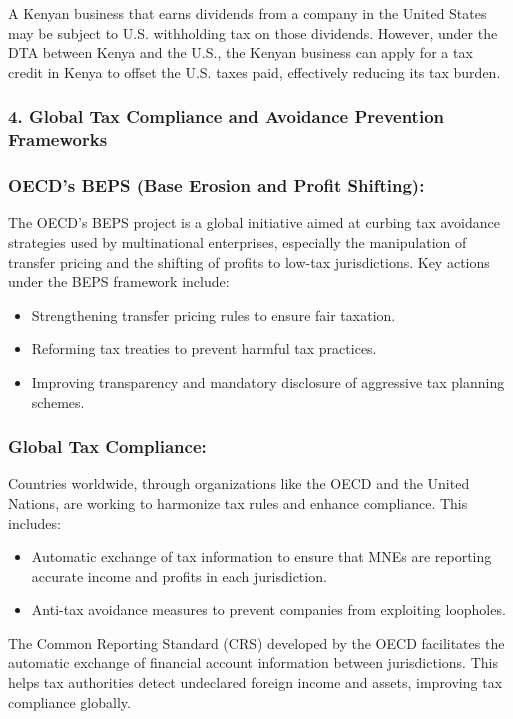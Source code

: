 \documentclass[10pt]{article}
\begin{document}
\begin{example}
	A Kenyan business that earns dividends from a company in the United States may be subject to U.S. withholding tax on those dividends. However, under the DTA between Kenya and the U.S., the Kenyan business can apply for a tax credit in Kenya to offset the U.S. taxes paid, effectively reducing its tax burden.
\end{example}


\subsubsection*{4. Global Tax Compliance and Avoidance Prevention Frameworks}
\subsubsection*{OECD's BEPS (Base Erosion and Profit Shifting):}
The OECD's BEPS project is a global initiative aimed at curbing tax avoidance strategies used by multinational enterprises, especially the manipulation of transfer pricing and the shifting of profits to low-tax jurisdictions. Key actions under the BEPS framework include:

\begin{itemize}
  \item Strengthening transfer pricing rules to ensure fair taxation.
  \item Reforming tax treaties to prevent harmful tax practices.
  \item Improving transparency and mandatory disclosure of aggressive tax planning schemes.
\end{itemize}

\subsubsection*{Global Tax Compliance:}
Countries worldwide, through organizations like the OECD and the United Nations, are working to harmonize tax rules and enhance compliance. This includes:

\begin{itemize}
  \item Automatic exchange of tax information to ensure that MNEs are reporting accurate income and profits in each jurisdiction.
  \item Anti-tax avoidance measures to prevent companies from exploiting loopholes.
\end{itemize}

\begin{example}
	The Common Reporting Standard (CRS) developed by the OECD facilitates the automatic exchange of financial account information between jurisdictions. This helps tax authorities detect undeclared foreign income and assets, improving tax compliance globally.
\end{example}
\end{document}

